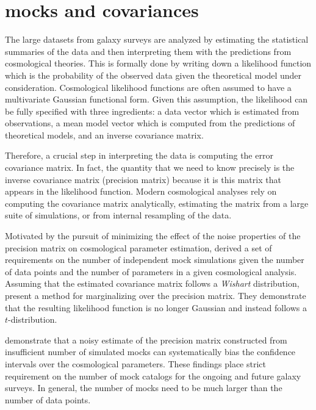 \section{mocks and covariances}

The large datasets from galaxy surveys are analyzed by estimating the statistical summaries of the 
data and then interpreting them with the predictions from cosmological theories. This is formally done 
by writing down a likelihood function which is the probability of the observed data given the theoretical model under 
consideration. Cosmological likelihood functions are often assumed to have a multivariate Gaussian 
functional form. Given this assumption, the likelihood can be fully specified with three ingredients: a data vector which is estimated from observations, a mean model vector 
which is computed from the predictions of theoretical models, and an inverse covariance matrix. 

Therefore, a crucial step in interpreting the data is computing the error covariance matrix. 
In fact, the quantity that we need to know precisely is the inverse covariance matrix (precision matrix) because it is this matrix that appears in the likelihood function. Modern cosmological analyses rely on computing the covariance matrix analytically, estimating the matrix from a large suite of simulations, or from internal resampling of the data. 

Motivated by the pursuit of minimizing the effect of the noise properties of the precision matrix on 
cosmological parameter estimation, \citet{dodelson2013,taylor2013,taylor2014} derived a set of requirements 
on the number of independent mock simulations given the number of data points and the number of parameters 
in a given cosmological analysis. Assuming that the estimated covariance matrix follows a \emph{Wishart} distribution, 
\citep{Sellentin:2016a} present a method for marginalizing over the precision matrix. They demonstrate that the 
resulting likelihood function is no longer Gaussian and instead follows a $t$-distribution.

\citet{dodelson2013,Sellentin:2017a} demonstrate that a noisy estimate of the precision matrix 
constructed from insufficient number of simulated mocks can systematically bias the confidence 
intervals over the cosmological parameters. These findings place strict requirement on the number of 
mock catalogs for the ongoing and future galaxy surveys. In general, the number of mocks need to be much larger than 
the number of data points.

